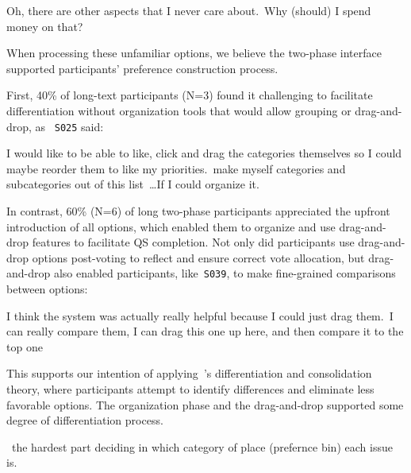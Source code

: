 {\begin{displayquote}
Oh, there are other aspects that I never care about.~\bracketellipsis Why (should) I spend money on that? \\\hfill{}
\end{displayquote}

When processing these unfamiliar options, we believe the two-phase interface supported participants' preference construction process.

First, 40\% of long-text participants (N=3) found it challenging to facilitate differentiation without organization tools that would allow grouping or drag-and-drop, as ~\texttt{S025} said:

\begin{displayquote}
    I would like to be able to like, click and drag the categories themselves so I could maybe reorder them to like my priorities.~\bracketellipsis make myself categories and subcategories out of this list~\ldots If I could organize it. \hfill{}
\end{displayquote}

In contrast, 60\% (N=6) of long two-phase participants appreciated the upfront introduction of all options, which enabled them to organize and use drag-and-drop features to facilitate QS completion. Not only did participants use drag-and-drop options post-voting to reflect and ensure correct vote allocation, but drag-and-drop also enabled participants, like~\texttt{S039}, to make fine-grained comparisons between options:

\begin{displayquote}  
    I think the system was actually really helpful because I could just drag them.~\bracketellipsis I can really compare them, I can drag this one up here, and then compare it to the top one~\bracketellipsis \hfill{}  
\end{displayquote}  

This supports our intention of applying~\citet{svensonDifferentiationConsolidationTheory1992}'s differentiation and consolidation theory, where participants attempt to identify differences and eliminate less favorable options. The organization phase and the drag-and-drop supported some degree of differentiation process.

\begin{displayquote}
    ~\bracketellipsis the hardest part deciding in which category of place (prefernce bin) each issue is. \hfill{}
\end{displayquote}

}
